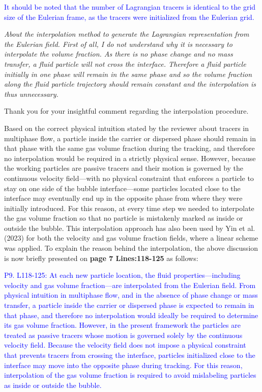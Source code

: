 \documentclass[a4paper]{article}
\begin{document}
\begin{enumerate}
\textcolor{blue}{It should be noted that the number of Lagrangian tracers is identical to the grid size of the Eulerian frame, as the tracers were initialized from the Eulerian grid.}


\textit{About the interpolation method to generate the Lagrangian representation from the Eulerian field. First of all, I do not understand why it is necessary to interpolate the volume fraction. As there is no phase change and no mass transfer, a fluid particle will not cross the interface. Therefore a fluid particle initially in one phase will remain in the same phase and so the volume fraction along the fluid particle trajectory should remain constant and the interpolation is thus unnecessary.}
\vspace{.2cm}

Thank you for your insightful comment regarding the interpolation procedure.

Based on the correct physical intuition stated by the reviewer about tracers in multiphase flow, a particle inside the carrier or dispersed phase should remain in that phase with the same gas volume fraction during the tracking, and therefore no interpolation would be required in a strictly physical sense. However, because the working particles are passive tracers and their motion is governed by the continuous velocity field—with no physical constraint that enforces a particle to stay on one side of the bubble interface—some particles located close to the interface may eventually end up in the opposite phase from where they were initially introduced. For this reason, at every time step we needed to interpolate the gas volume fraction so that no particle is mistakenly marked as inside or outside the bubble. This interpolation approach has also been used by Yin et al. (2023) for both the velocity and gas volume fraction fields, where a linear scheme was applied. To explain the reason behind the interpolation, the above discussion is now briefly presented on \textbf{page 7 Lines:118-125} as follows:


\textcolor{blue}{P9. L118-125: At each new particle location, the fluid properties—including velocity and gas volume fraction—are interpolated from the Eulerian field. From physical intuition in multiphase flow, and in the absence of phase change or mass transfer, a particle inside the carrier or dispersed phase is expected to remain in that phase, and therefore no interpolation would ideally be required to determine its gas volume fraction. However, in the present framework the particles are treated as passive tracers whose motion is governed solely by the continuous velocity field. Because the velocity field does not impose a physical constraint that prevents tracers from crossing the interface, particles initialized close to the interface may move into the opposite phase during tracking. For this reason, interpolation of the gas volume fraction is required to avoid mislabeling particles as inside or outside the bubble.}


\end{enumerate}
\end{document}
